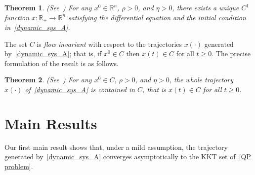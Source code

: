 \documentclass[11pt]{article}
\newtheorem{theorem}{Theorem}
\theoremstyle{definition}
\theoremstyle{remark}
\begin{document}
\begin{theorem}\label{global_sol_A} {\rm (See~\cite[Theorem~2.1]{pty_2025})} For any $x^0\in\mathbb R^n$, $\rho>0$, and $\eta>0$, there exists a unique $C^1$ function $x:\mathbb{R}_+\to\mathbb R^n$ satisfying the differential equation and the initial condition in~\eqref{dynamic_sys_A}.
\end{theorem}

The set $C$ is \textit{flow invariant} with respect to  the trajectories $x(\cdot)$ generated by~\eqref{dynamic_sys_A}; that is, if $x^0\in C$ then $x(t)\in C$ for all $t\geq 0$. The precise formulation of the result is as follows.

\begin{theorem}\label{flow_invariant_A} {\rm (See~\cite[Theorem~2.3]{pty_2025})} For any $x^0\in C$, $\rho>0$, and $\eta>0$, the whole trajectory $x(\cdot)$ of~\eqref{dynamic_sys_A} is contained in $C$, that is $x(t)\in C$ for all $t\geq 0$. 
\end{theorem}

\section{Main Results}\label{Sect-3}

Our first main result shows that, under a mild assumption, the trajectory generated by~\eqref{dynamic_sys_A} converges asymptotically to the KKT set of~\eqref{QP problem}.
\end{document}
